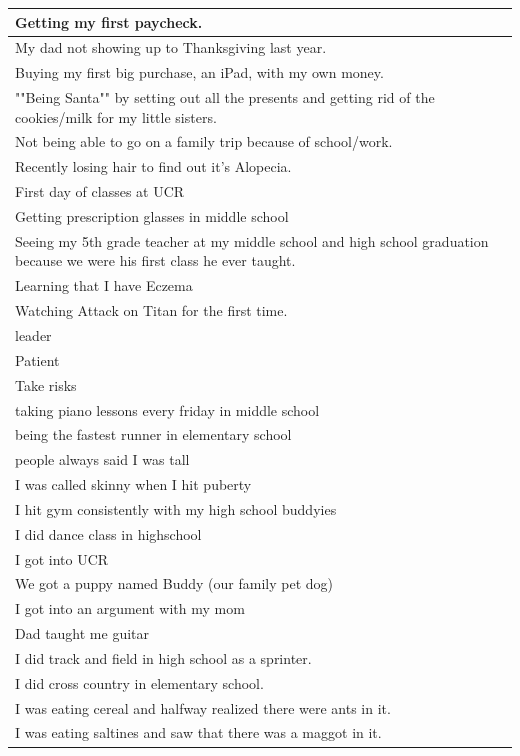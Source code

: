\documentclass[
  .7em,
  letterpaper,
  DIV=11,
  numbers=noendperiod]{scrartcl}
\begin{document}
\begin{table}
\begin{tabular}{l}
\hline
Getting my first paycheck.\\
\hline
My dad not showing up to Thanksgiving last year.\\
\hline
Buying my first big purchase, an iPad, with my own money.\\
\hline
""Being Santa"" by setting out all the presents and getting rid of the cookies/milk for my little sisters.\\
\hline
Not being able to go on a family trip because of school/work.\\
\hline
Recently losing hair to find out it's Alopecia.\\
\hline
First day of classes at UCR\\
\hline
Getting prescription glasses in middle school\\
\hline
Seeing my 5th grade teacher at my middle school and high school graduation because we were his first class he ever taught.\\
\hline
Learning that I have Eczema\\
\hline
Watching Attack on Titan for the first time.\\
\hline
leader\\
\hline
Patient\\
\hline
Take risks\\
\hline
taking piano lessons every friday in middle school\\
\hline
being the fastest runner in elementary school\\
\hline
people always said I was tall\\
\hline
I was called skinny when I hit puberty\\
\hline
I hit gym consistently with my high school buddyies\\
\hline
I did dance class in highschool\\
\hline
I got into UCR\\
\hline
We got a puppy named Buddy (our family pet dog)\\
\hline
I got into an argument with my mom\\
\hline
Dad taught me guitar\\
\hline
I did track and field in high school as a sprinter.\\
\hline
I did cross country in elementary school.\\
\hline
I was eating cereal and halfway realized there were ants in it.\\
\hline
I was eating saltines and saw that there was a maggot in it.\\

\end{tabular}
\end{table}
\end{document}

